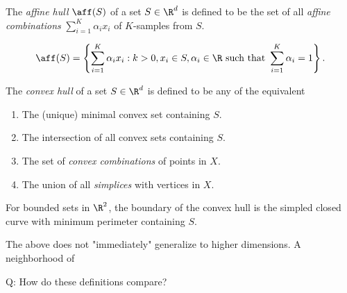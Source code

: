 \begin{defn}
	The \emph{affine hull} $\aff(S)$ of a set $S \in \R^d$ is
	defined to be the set of all \emph{affine combinations}
	$\sum_{i=1}^K \alpha_i x_i$ of $K$-samples from $S$.
	
	\begin{align}
		\aff(S) = \left\{ \sum_{i=1}^K \alpha_i x_i : k > 0, 
							x_i \in S, \alpha_i \in \R 
							\text{ such that } \sum_{i=1}^K 		
							\alpha_i = 1 \right\}.
	\end{align}

\end{defn}

\begin{defn}
	The \emph{convex hull} of a set $S \in \R^d$ is defined
	to be any of the equivalent
	\begin{enumerate}
		\item The (unique) minimal convex set containing $S$.
		\item The intersection of all convex sets containing $S$.
		\item The set of \emph{convex combinations} of points in
			$X$.
		\item The union of all \emph{simplices} with vertices in
		$X$.
	\end{enumerate}
\end{defn}

\begin{prop}
	For bounded sets in $\R^2$, the boundary of the convex hull
	is the simpled closed curve with minimum perimeter containing
	$S$.
\end{prop}

The above does not "immediately" generalize to higher dimensions.
A neighborhood of 




\begin{remark}
	Q: How do these definitions compare? 
\end{remark}

















	
	
	
	

